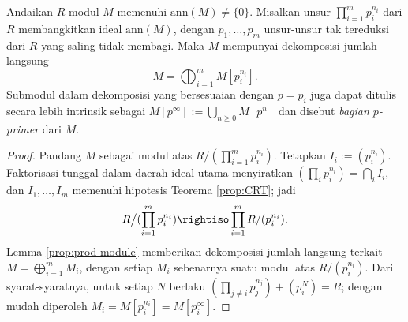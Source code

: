 \begin{lemma}\label{prop:PID-primary-decomp}
	Andaikan $R$-modul $M$ memenuhi $\mathrm{ann}(M) \neq \{0\}$. Misalkan unsur $\prod_{i=1}^m p_i^{n_i}$ dari $R$ membangkitkan ideal $\mathrm{ann}(M)$, dengan $p_1, \ldots, p_m$ unsur-unsur tak tereduksi dari $R$ yang saling tidak membagi. Maka $M$ mempunyai dekomposisi jumlah langsung
	\[ M = \bigoplus_{i=1}^m M[p_i^{n_i}]. \]
	Submodul dalam dekomposisi yang bersesuaian dengan $p = p_i$ juga dapat ditulis secara lebih intrinsik sebagai $M[p^\infty] := \bigcup_{n \geq 0} M[p^n]$ dan disebut \emph{bagian $p$-primer} dari $M$. 
\end{lemma}
\begin{proof}
	Pandang $M$ sebagai modul atas $R/(\prod_{i=1}^m p_i^{n_i})$. Tetapkan $I_i := (p_i^{n_i})$. Faktorisasi tunggal dalam daerah ideal utama menyiratkan $(\prod_i p_i^{n_i}) = \bigcap_i I_i$, dan $I_1, \ldots, I_m$ memenuhi hipotesis Teorema \ref{prop:CRT}; jadi
	\[ R \big/ ( \prod_{i=1}^m p_i^{n_i} ) \rightiso \prod_{i=1}^m R/(p_i^{n_i}). \]
	Lemma \ref{prop:prod-module} memberikan dekomposisi jumlah langsung terkait $M = \bigoplus_{i=1}^m M_i$, dengan setiap $M_i$ sebenarnya suatu modul atas $R/(p_i^{n_i})$. Dari syarat-syaratnya, untuk setiap $N$ berlaku $(\prod_{j \neq i} p_j^{n_j}) + (p_i^N) = R$; dengan mudah diperoleh $M_i = M[p_i^{n_i}] = M[p_i^{\infty}]$.
\end{proof}


